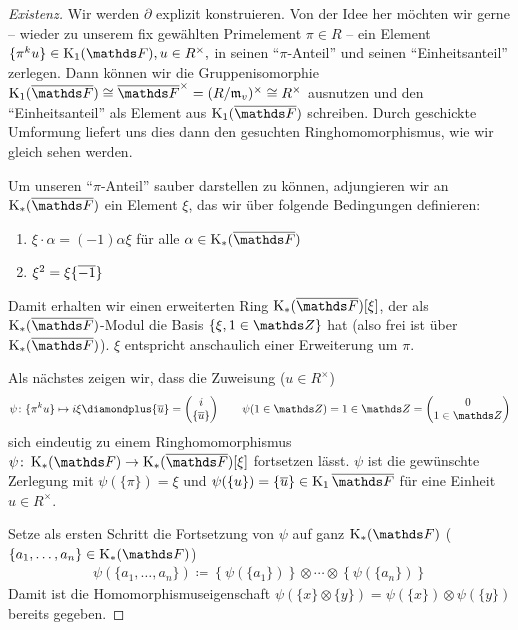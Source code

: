 \documentclass[ngerman,fontsize=11pt, paper=a4, parskip=half, titlepage=true, toc=bib]{scrartcl}
\begin{document}
\begin{proof}[Existenz]
  Wir werden $\partial$ explizit konstruieren.
  Von der Idee her möchten wir gerne – wieder zu unserem fix gewählten
  Primelement $\pi\in R$ – ein Element $\{\pi^ku\}\in\KoF, u\in R^\times,$
  in seinen \enquote{$\pi$-Anteil} und seinen 
  \enquote{Einheitsanteil} zerlegen. 
  Dann können wir die Gruppenisomorphie
  $\K_1(\bF)\cong\bF^\times=(R/\frakm_v)^\times\cong R^\times$
  ausnutzen und den \enquote{Einheitsanteil} als Element aus $\K_1(\bF)$
  schreiben. Durch geschickte Umformung liefert uns dies dann den
  gesuchten Ringhomomorphismus, wie wir gleich sehen werden.
  
  Um unseren \enquote{$\pi$-Anteil} sauber darstellen zu können,
  adjungieren wir an $\KbF$ ein Element $\xi$, das wir über
  folgende Bedingungen definieren:
  \begin{enumerate}[(1)]
  \item $\xi\cdot \alpha=(-1)\alpha\xi$ für alle $\alpha\in\KbF$
  \item $\xi^2=\xi\{\overline{-1}\}$
  \end{enumerate}
  Damit erhalten wir einen erweiterten Ring $\KbF[\xi]$, der als
  $\KbF$-Modul die Basis $\{ \xi, 1\in\Z\}$ hat (also frei ist über
  $\KbF$). $\xi$ entspricht anschaulich einer Erweiterung um $\pi$.

  Als nächstes zeigen wir, dass die Zuweisung ($u\in R^\times$)
  \begin{gather*}
    \psi\colon\{\pi^ku\}\mapsto i\xi \p \{\ov u\}
    =\begin{pmatrix} i\\\{\ov u\} \end{pmatrix}
    \qquad \psi(1\in\Z)=1\in\Z=\begin{pmatrix}0\\1\in\Z\end{pmatrix}
  \end{gather*}
  sich eindeutig zu einem Ringhomomorphismus
  $\psi\colon\KF\to\KbF[\xi]$ fortsetzen lässt.
  $\psi$ ist die gewünschte Zerlegung mit $\psi(\{\pi\})=\xi$ 
  und $\psi(\{u\})=\{\ov u\}\in\K_1\bF$ für
  eine Einheit $u\in R^\times$.
  
  Setze als ersten Schritt die Fortsetzung von $\psi$ auf ganz $\KF$
  ($\{a_1,\dotsc,a_n\}\in\KF$)
  \begin{gather*}
    \psi(\{a_1,\dotsc,a_n\})
    \coloneqq \left\{\psi(\{a_1\})\right\}\otimes\dotsb
      \otimes \left\{\psi(\{a_n\})\right\}
  \end{gather*}
  Damit ist die Homomorphismuseigenschaft
  $\psi(\{x\}\otimes\{y\})=\psi(\{x\})\otimes\psi(\{y\})$
  bereits gegeben.


\end{proof}
\end{document}
